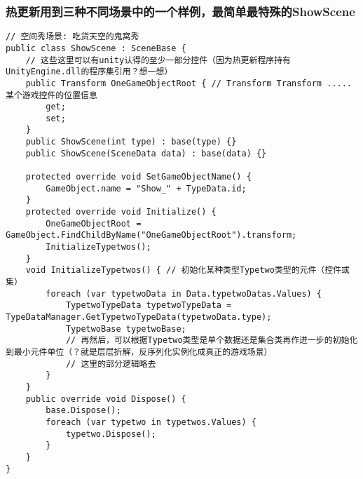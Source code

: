 \documentclass[9pt, b5paper]{article}
\begin{document}
\subsubsection{热更新用到三种不同场景中的一个样例，最简单最特殊的ShowScene}
\label{sec-1-2-2}
\begin{verbatim}
// 空间秀场景: 吃货天空的鬼窝秀
public class ShowScene : SceneBase {
    // 这些这里可以有unity认得的至少一部分控件（因为热更新程序持有UnityEngine.dll的程序集引用？想一想）
    public Transform OneGameObjectRoot { // Transform Transform ..... 某个游戏控件的位置信息
        get;
        set;
    }
    public ShowScene(int type) : base(type) {}
    public ShowScene(SceneData data) : base(data) {}

    protected override void SetGameObjectName() {
        GameObject.name = "Show_" + TypeData.id;
    }
    protected override void Initialize() {
        OneGameObjectRoot = GameObject.FindChildByName("OneGameObjectRoot").transform;
        InitializeTypetwos();
    }
    void InitializeTypetwos() { // 初始化某种类型Typetwo类型的元件（控件或集）
        foreach (var typetwoData in Data.typetwoDatas.Values) {
            TypetwoTypeData typetwoTypeData = TypeDataManager.GetTypetwoTypeData(typetwoData.type);
            TypetwoBase typetwoBase;
            // 再然后，可以根据Typetwo类型是单个数据还是集合类再作进一步的初始化到最小元件单位（？就是层层折解，反序列化实例化成真正的游戏场景）
            // 这里的部分逻辑略去
        }
    }
    public override void Dispose() {
        base.Dispose();
        foreach (var typetwo in typetwos.Values) {
            typetwo.Dispose();
        }
    }
}
\end{verbatim}
\end{document}
